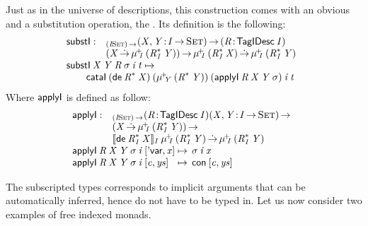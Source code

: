 Just as in the universe of descriptions, this construction comes with
an obvious \return and a substitution operation, the \bind. Its
definition is the following:
%
\[\stk{
\begin{array}{@{}ll}
\substI : & _{\PI{\V{I}}{\Set}}
            \PI{\V{X}, \V{Y}}{\V{I} \To \Set}
            \PITEL{\V{R}}{\TagIDesc{\V{I}}} \\
          & (\V{X} \DotTo 
             \muide{\V{I}}{(\FreeIMonad{\V{R}}{\V{I}}{\V{Y}})}) \To 
             \muide{\V{I}}{(\FreeIMonad{\V{R}}{\V{I}}{\V{X}})} \DotTo
             \muide{\V{I}}{(\FreeIMonad{\V{R}}{\V{I}}{\V{Y}})}
\end{array} \\
\substI\: \V{X}\: \V{Y}\: \V{R}\: \V{\sigma}\: \V{i}\: \V{t} \mapsto \\
\qquad    \cataI\: (\toIDesc{\FreeIMonad{\V{R}}{}{\V{X}}})\:
                      (\muide{\V{Y}}{(\FreeIMonad{\V{R}}{}{\V{Y}})})\:
                      (\F{applyI}\: \V{R}\: \V{X}\: \V{Y}\: \V{\sigma})\:
                      \V{i}\:
                      \V{t} 
}\]
% 
Where  $\F{applyI}$ is defined as follow:
%
\[\stk{
\begin{array}{@{}ll}
\F{applyI} : & _{\PI{\V{I}}{\Set}}
            \PITEL{\V{R}}{\TagIDesc{\V{I}}}
            \PI{\V{X}, \V{Y}}{\V{I} \To \Set} \\
          & (\V{X} \DotTo \muide{\V{I}}{(\FreeIMonad{\V{R}}{\V{I}}{\V{Y}})}{}) \To \\
          & \idescop{\toIDesc{\FreeIMonad{\V{R}}
                                         {\V{I}}
                                         {\V{X}}}}
                    {\V{I}}
                    {\muide{\V{I}}{(\FreeIMonad{\V{R}}{\V{I}}{\V{Y}})}} \DotTo 
            \muide{\V{I}}{(\FreeIMonad{\V{R}}{\V{I}}{\V{Y}})}{}
\end{array} \\
\begin{array}{@{}l@{\:\mapsto\:\:}l}
\F{applyI}\: \V{R}\: \V{X}\: \V{Y}\: \V{\sigma}\: \V{i}\: \pair{\SYMBDVar}{\V{x}}{}   & \V{\sigma}\: \V{i}\: \V{x}                   \\
\F{applyI}\: \V{R}\: \V{X}\: \V{Y}\: \V{\sigma}\: \V{i}\: \pair{\V{c}}{\V{ys}}{} & \Con{\pair{\V{c}}{\V{ys}}{}}
\end{array}
}\]
 
The subscripted types corresponds to implicit arguments that can be
automatically inferred, hence do not have to be typed in. Let us now
consider two examples of free indexed monads.


